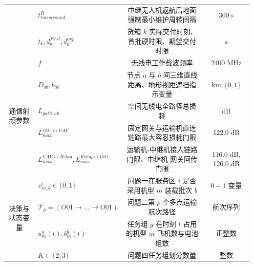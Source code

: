 \begin{table}[htbp]
\begin{tabular}{clcc}
    & $t_{turnaround}^R$ & 中继无人机返航后地面强制最小维护周转间隔 & 300 s \\
    & $t_k, d_k^{first}, d_k^{exp}$ & 货箱 $k$ 实际交付时刻、首批硬时限、期望交付时限 & $\text{s}$ \\
    \midrule
    \multirow{5}{*}{通信射频参数} 
    & $f$ & 无线电工作载波频率 & 2400 MHz \\
    & $D_{ab}, b_{ab}$ & 节点 $a$ 与 $b$ 间三维直线距离、地形视距遮挡指示变量 & $\text{km}, \{0, 1\}$ \\
    & $L_{path, ab}$ & 空间无线电全路径总损耗 & $\text{dB}$ \\
    & $L_{max}^{G01 \leftrightarrow UAV}$ & 固定网关与运输机直连链路最大容忍损耗门限 & 122.0 dB \\
    & $L_{max}^{UAV \leftrightarrow Relay}, L_{max}^{Relay \leftrightarrow G01}$ & 运输机-中继机接入链路门限、中继机-网关回传门限 & 116.0 dB, 126.0 dB \\
    \midrule
    \multirow{4}{*}{决策与状态变量} 
    & $x_{m,b}^i \in \{0, 1\}$ & 问题一在服务区 $i$ 是否采用机型 $m$ 装载批次 $b$ & $0-1$ 变量 \\
    & $\mathcal{T}_p = (O01 \to \dots \to O01)$ & 问题二第 $p$ 个多点运输航次路径 & 航次序列 \\
    & $u_m^g(t), b_m^g(t)$ & 任务组 $g$ 在时刻 $t$ 占用的机型 $m$ 飞机数与电池组数 & 正整数 \\
    & $K \in \{2, 3\}$ & 问题四任务组划分数量 & 整数 \\
    \bottomrule
  \end{tabular}
\end{table}
